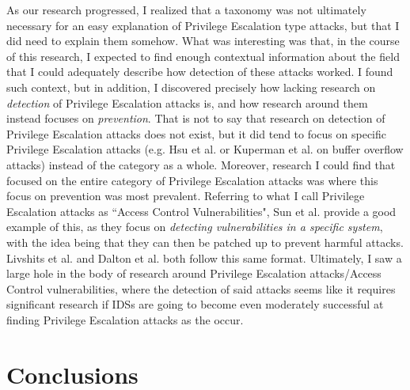 \documentclass{acm_proc_article-sp}
\begin{document}
    	As our research progressed, I realized that a taxonomy was not ultimately necessary for an easy explanation of Privilege Escalation type attacks, but that I did need to explain them somehow. What was interesting was that, in the course of this research, I expected to find enough contextual information about the field that I could adequately describe how detection of these attacks worked. I found such context, but in addition, I discovered precisely how lacking research on \emph{detection} of Privilege Escalation attacks is, and how research around them instead focuses on \emph{prevention}. That is not to say that research on detection of Privilege Escalation attacks does not exist, but it did tend to focus on specific Privilege Escalation attacks (e.g. Hsu et al. \cite{Hsu2006} or Kuperman et al. \cite{Kuperman2005} on buffer overflow attacks) instead of the category as a whole. Moreover, research I could find that focused on the entire category of Privilege Escalation attacks was where this focus on prevention was most prevalent. Referring to what I call Privilege Escalation attacks as ``Access Control Vulnerabilities", Sun et al. \cite{Sun2011} provide a good example of this, as they focus on \emph{detecting vulnerabilities in a specific system}, with the idea being that they can then be patched up to prevent harmful attacks. Livshits et al. \cite{Livshits2005} and Dalton et al. \cite{Dalton2009} both follow this same format. Ultimately, I saw a large hole in the body of research around Privilege Escalation attacks/Access Control vulnerabilities, where the detection of said attacks seems like it requires significant research if IDSs are going to become even moderately successful at finding Privilege Escalation attacks as the occur.

\section{Conclusions}

	

{}  %
\nocite{*}
%
%
\balancecolumns
\end{document}
